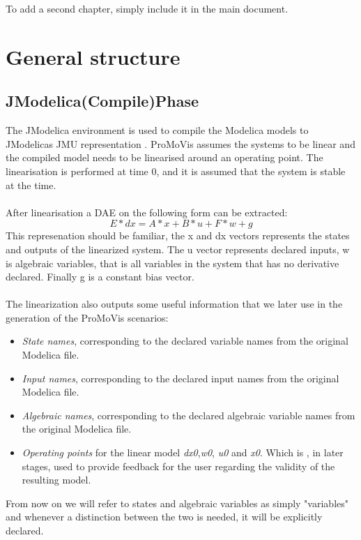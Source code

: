 To add a second chapter, simply include it in the main document.

\section{General structure}
\subsection{JModelica(Compile)Phase}
The JModelica environment is used to compile the Modelica models to JModelicas JMU representation \cite{jmodelicaorg}\nocite{*}. ProMoVis assumes the systems to be linear and the compiled model needs to be linearised around an operating point. The linearisation is performed at time 0, and it is assumed that the system is stable at the time.\\\\After linearisation a DAE on the following form can be extracted:
\begin{equation}
E*dx = A*x + B*u + F*w + g
\end{equation}
This represenation should be familiar, the x and dx vectors represents the states and outputs of the linearized system. The u vector represents declared inputs, w is algebraic variables, that is all variables in the system that has no derivative declared. Finally g is a constant bias vector.\\\\The linearization also outputs some useful information that we later use in the generation of the ProMoVis scenarios:
\begin{itemize}
\item \textit{State names}, corresponding to the declared variable names from the original Modelica file.
\item \textit{Input names}, corresponding to the declared input names from the original Modelica file.
\item \textit{Algebraic names}, corresponding to the declared algebraic variable names from the original Modelica file.
\item \textit{Operating points} for the linear model \textit{dx0},\textit{w0}, \textit{u0} and \textit{x0}. Which is , in later stages, used to provide feedback for the user regarding the validity of the resulting model.
\end{itemize}
From now on we will refer to states and algebraic variables as simply "variables" and whenever a distinction between the two is needed, it will be explicitly declared. 

